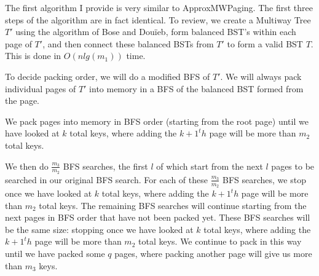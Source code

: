 \documentclass[letterpaper,12pt,titlepage,oneside,final]{book}
\theoremstyle{plain}
\begin{document}
The first algorithm I provide is very similar to ApproxMWPaging. The first three steps of the algorithm are in fact identical. To review, we create a Multiway Tree $T'$ using the algorithm of Bose and Dou\"{i}eb, form balanced BST's within each page of $T'$, and then connect these balanced BSTs from $T'$ to form a valid BST $T$. This is done in $O(n lg(m_1))$ time. 

To decide packing order, we will do a modified BFS of $T'$. We will always pack individual pages of $T'$ into memory in a BFS of the balanced BST formed from the page. 

\iffalse
# returns (leaf or pointer to correct key if exists)
Search(curr, key, block_stack, offset_stack)
	mem <- correct child of (curr - offset)
	if mem < m_1 # if we are in the upper most block we are fine
		curr = mem
		if mem is leaf or the key return that
		else return search(curr, key, block_stack, offset_stack)
		
	while (! block_stack.empty() AND mem > m'[block_stack.top()])
		offset_stack.pop()
		block_stack.pop()

	if block_stack.empty() 
		new_block_i = min i such that m_i' > mem
		block_stack.push(new_block_i)
		offset_stack.push(mem)
		[mem, mem + m_{i-1}-1] -> [m'_{i-2}, m'_{i-1}-1]
		return search(mem, key, block_stack, offset_stack)\

# TO RUN
search(root, key, empty empty)


----------------------------------------

# returns (r[], loc)
pack(r[], i, loc)
	if i = 0
		from r[0] pack up to m_1 keys into memory in BFS order
		loc += amount packed
		push all children of all leaves of the BFS tree into r
		return (r[1, ... r.end()], loc)
	else
		total = 0
		while (total < m_{i+1} and !r.empty())
			(loc, r) = pack(r[0, ... r.end()], i-1, loc)

		return (r, loc)

# TO RUN
r.push_back(root)
loc = 0
for j = 0 to l-1
	(loc,r) = pack(r,j,loc
	
\fi


We pack pages into memory in BFS order (starting from the root page) until we have looked at $k$ total keys, where adding the $k+1^th$ page will be more than $m_2$ total keys.

We then do $\frac{m_3}{m_2}$ BFS searches, the first $l$ of which start from the next $l$ pages to be searched in our original BFS search. For each of these $\frac{m_3}{m_2}$ BFS searches, we stop once we have looked at  $k$ total keys, where adding the $k+1^th$ page will be more than $m_2$ total keys. The remaining BFS searches will continue starting from the next pages in BFS order that have not been packed yet. These BFS searches will be the same size: stopping once we have looked at  $k$ total keys, where adding the $k+1^th$ page will be more than $m_2$ total keys. We continue to pack in this way until we have packed some $q$ pages, where packing another page will give us more than $m_3$ keys.
\end{document}
